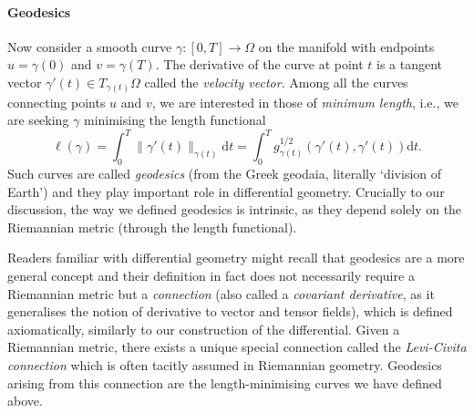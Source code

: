 











\paragraph{Geodesics}

Now consider a smooth curve $\gamma : [0,T] \rightarrow \Omega$ on the manifold with endpoints $u = \gamma(0)$ and $v = \gamma(T)$. The derivative of the curve at point $t$ is a tangent vector $\gamma'(t) \in T_{\gamma(t)}\Omega$ called the {\em velocity vector}.  
%
Among all the curves connecting points $u$ and $v$, we are interested in those of {\em minimum length}, i.e., we are seeking $\gamma$ minimising the length functional 
%
$$
\ell(\gamma) = \int_{0}^T \| \gamma'(t) \|_{\gamma(t)} \mathrm{d}t =  \int_{0}^T g_{\gamma(t)}^{1/2} (\gamma'(t), \gamma'(t)) \mathrm{d}t. 
$$
%
Such curves are called {\em geodesics} (from the Greek \textgreek{geodaia}, literally `division of Earth') and they play important role in differential geometry. 
%
%
Crucially to our discussion, the way we defined geodesics is intrinsic, as they depend solely on the Riemannian metric (through the length functional). 


Readers familiar with differential geometry might recall that geodesics are a more general concept and their definition in fact does not necessarily require a Riemannian metric but a {\em connection} (also called a {\em covariant derivative}, as it generalises the notion of derivative to vector and tensor fields), which is defined axiomatically, similarly to our construction of the differential. 
%
Given a Riemannian metric, there exists a unique special connection called the {\em Levi-Civita connection}  which is often tacitly assumed in Riemannian geometry. Geodesics arising from this connection are the length-minimising curves we have defined above. 


